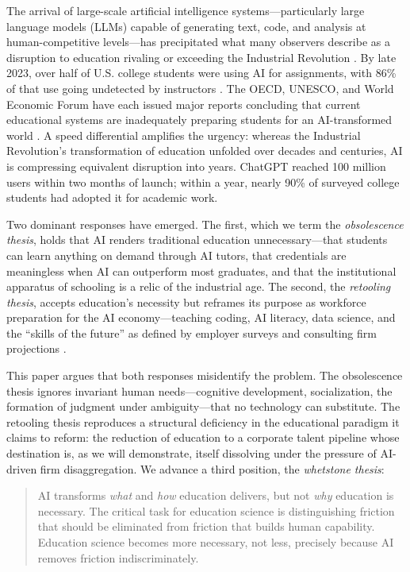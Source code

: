 \documentclass[12pt]{article}
\begin{document}
The arrival of large-scale artificial intelligence systems---particularly large language models (LLMs) capable of generating text, code, and analysis at human-competitive levels---has precipitated what many observers describe as a disruption to education rivaling or exceeding the Industrial Revolution \citep{Seldon2018fourth, WEF2025jobs}. By late 2023, over half of U.S. college students were using AI for assignments, with 86\% of that use going undetected by instructors \citep{CognitiveParadox2025}. The OECD, UNESCO, and World Economic Forum have each issued major reports concluding that current educational systems are inadequately preparing students for an AI-transformed world \citep{OECD2026digital, UNESCO2025futures, WEF2025jobs}. A speed differential amplifies the urgency: whereas the Industrial Revolution's transformation of education unfolded over decades and centuries, AI is compressing equivalent disruption into years. ChatGPT reached 100 million users within two months of launch; within a year, nearly 90\% of surveyed college students had adopted it for academic work.

Two dominant responses have emerged. The first, which we term the \emph{obsolescence thesis}, holds that AI renders traditional education unnecessary---that students can learn anything on demand through AI tutors, that credentials are meaningless when AI can outperform most graduates, and that the institutional apparatus of schooling is a relic of the industrial age. The second, the \emph{retooling thesis}, accepts education's necessity but reframes its purpose as workforce preparation for the AI economy---teaching coding, AI literacy, data science, and the ``skills of the future'' as defined by employer surveys and consulting firm projections \citep{WEF2025jobs, Microsoft2025education}.

This paper argues that both responses misidentify the problem. The obsolescence thesis ignores invariant human needs---cognitive development, socialization, the formation of judgment under ambiguity---that no technology can substitute. The retooling thesis reproduces a structural deficiency in the educational paradigm it claims to reform: the reduction of education to a corporate talent pipeline whose destination is, as we will demonstrate, itself dissolving under the pressure of AI-driven firm disaggregation. We advance a third position, the \emph{whetstone thesis}:

\begin{quote}
AI transforms \emph{what} and \emph{how} education delivers, but not \emph{why} education is necessary. The critical task for education science is distinguishing friction that should be eliminated from friction that builds human capability. Education science becomes more necessary, not less, precisely because AI removes friction indiscriminately.
\end{quote}
\end{document}
